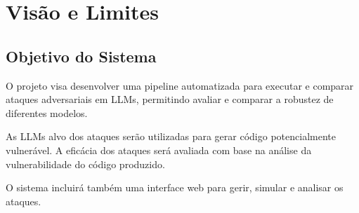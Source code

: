 \section{Visão e Limites}
\subsection{Objetivo do Sistema}
O projeto visa desenvolver uma pipeline automatizada para executar e comparar ataques adversariais em LLMs, permitindo avaliar e comparar a robustez de diferentes modelos.

As LLMs alvo dos ataques serão utilizadas para gerar código potencialmente vulnerável. A eficácia dos ataques será avaliada com base na análise da vulnerabilidade do código produzido.

O sistema incluirá também uma interface web para gerir, simular e analisar os ataques.

